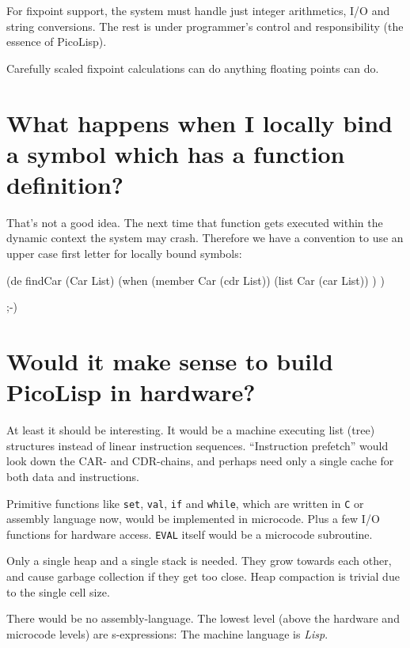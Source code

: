 For fixpoint support, the system must handle just integer arithmetics,
I/O and string conversions. The rest is under programmer's control and
responsibility (the essence of PicoLisp).

Carefully scaled fixpoint calculations can do anything floating points
can do.

 
\section{What happens when I locally bind a symbol which has a function
definition?} 
\label{sec:faq-what-happens-when-i-locally-bind-a-symbol-which-has-a-function}

That's not a good idea. The next time that function gets executed within
the dynamic context the system may crash. Therefore we have a convention
to use an upper case first letter for locally bound symbols:


\begin{wideverbatim}
(de findCar (Car List)
   (when (member Car (cdr List))
      (list Car (car List)) ) )
\end{wideverbatim}

;-)

 
\section{Would it make sense to build PicoLisp in hardware?}
\label{sec:faq-would-it-make-sense-to-build-picolisp-in-hardware?}


At least it should be interesting. It would be a machine executing list
(tree) structures instead of linear instruction sequences. ``Instruction
prefetch'' would look down the CAR- and CDR-chains, and perhaps need only
a single cache for both data and instructions.

Primitive functions like \texttt{set}, \texttt{val}, \texttt{if} and \texttt{while}, which are
written in \texttt{C} or assembly language now, would be implemented in
microcode. Plus a few I/O functions for hardware access. \texttt{EVAL} itself
would be a microcode subroutine.

Only a single heap and a single stack is needed. They grow towards each
other, and cause garbage collection if they get too close. Heap
compaction is trivial due to the single cell size.

There would be no assembly-language. The lowest level (above the
hardware and microcode levels) are s-expressions: The machine language
is \emph{Lisp}.

